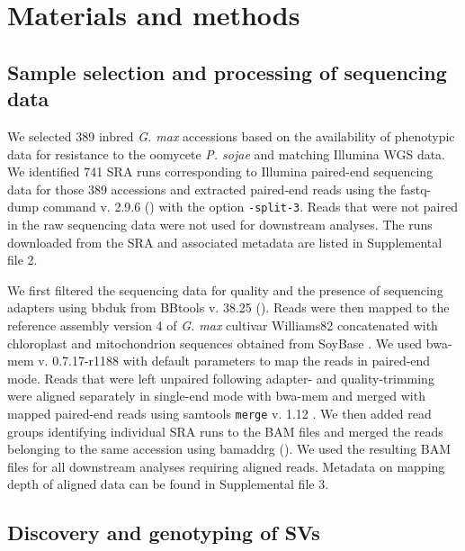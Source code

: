 \documentclass{article}
\begin{document}
\clearpage

\section*{Materials and methods}

\subsection*{Sample selection and processing of sequencing data}

We selected 389 inbred \emph{G. max} accessions based on the availability of
phenotypic data for resistance to the oomycete \emph{P.
sojae}  and matching Illumina WGS data. We identified 741 SRA runs corresponding to
Illumina paired-end sequencing data for those 389 accessions 
and extracted paired-end reads using the fastq-dump command v. 2.9.6
(\citeauthor{sratoolkit}) with the
option \texttt{-\-split-3}.
Reads that were not paired in the raw sequencing data were not used
for downstream analyses.  The runs downloaded from the SRA and associated
metadata are listed in Supplemental file 2.

We first filtered the sequencing data for quality and the presence of sequencing
adapters using bbduk from BBtools v. 38.25
(\citeauthor{bbtools}). Reads
were then mapped to the reference assembly version 4 of \emph{G. max}
cultivar Williams82  concatenated with chloroplast
and mitochondrion sequences obtained from SoyBase . We used
bwa-mem v. 0.7.17-r1188  with default parameters to map the
reads in paired-end mode. Reads that were left unpaired following adapter- and
quality-trimming were aligned separately in single-end mode with bwa-mem and
merged with mapped paired-end reads using samtools \texttt{merge}
v. 1.12 .  We then added read groups identifying
individual SRA runs to the BAM files and merged the reads belonging to the same
accession using bamaddrg
(\citeauthor{bamaddrg}). We used the
resulting BAM files for all downstream analyses requiring aligned reads.
Metadata on mapping depth of aligned data can be found in Supplemental file 3.

\subsection*{Discovery and genotyping of SVs}
\end{document}
